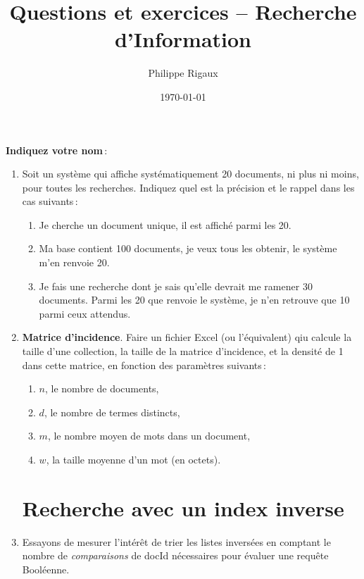 \documentclass{article}
\title{Questions et exercices -- Recherche d'Information}
\author{Philippe Rigaux}
\date{\today}
\begin{document}
\maketitle

\textbf{Indiquez votre nom}\,:


\begin{enumerate}

\section{Généralités}

\item Soit un système qui affiche systématiquement 20 documents, ni plus ni moins, pour toutes les recherches. Indiquez
quel est la précision et le rappel dans les cas suivants\,:

\begin{enumerate}
  \item Je cherche un document unique, il est affiché parmi les 20.
  \item Ma base contient 100 documents, je veux tous les obtenir, le système m'en renvoie 20.
  \item Je fais une recherche dont je sais qu'elle devrait me ramener 30 documents. Parmi les
     20 que renvoie le système, je n'en retrouve que 10 parmi ceux attendus.
\end{enumerate}

\item \textbf{Matrice d'incidence}. Faire un fichier Excel (ou l'équivalent) qiu calcule la
   taille d'une collection, la taille de la matrice d'incidence, et la densité de 1 dans cette
   matrice, en fonction des paramètres suivants\,:
     \begin{enumerate}
       \item $n$, le nombre de documents,
       \item $d$, le nombre de termes distincts,
       \item $m$, le nombre moyen de mots dans un document,
       \item $w$, la taille moyenne d'un mot (en octets).
     \end{enumerate}
     


\section{Recherche avec un index inverse}

\item Essayons de mesurer l'intérêt de trier les listes inversées en comptant le nombre
   de \emph{comparaisons} de docId nécessaires pour évaluer une requête Booléenne.
   

\end{enumerate}
\end{document}
